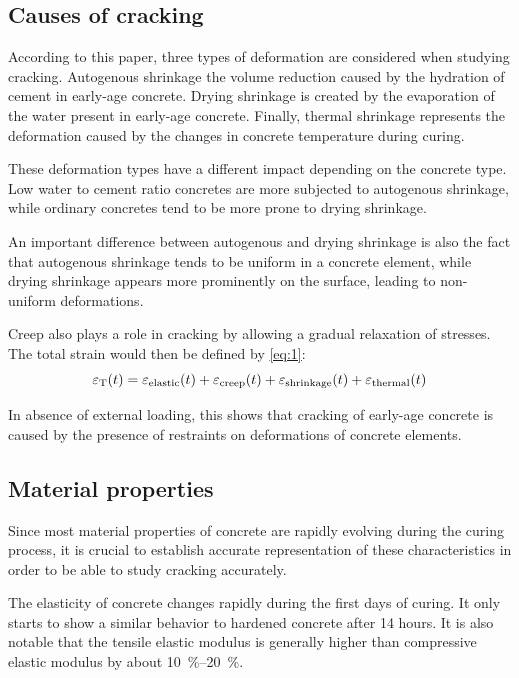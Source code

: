 \documentclass[a4paper,11pt]{memoir}
\begin{document}
\subsection{Causes of cracking}
According to this paper, three types of deformation are considered when
studying cracking. Autogenous shrinkage the volume reduction
caused by the hydration of cement in early-age concrete. Drying shrinkage is
created by the evaporation of the water present in early-age concrete. Finally,
thermal shrinkage represents the deformation caused by the changes in concrete
temperature during curing.

These deformation types have a different impact depending on the concrete type.
Low water to cement ratio concretes are more subjected to autogenous shrinkage, while
ordinary concretes tend to be more prone to drying shrinkage.

An important difference between autogenous and drying shrinkage is also the
fact that autogenous shrinkage tends to be uniform in a concrete element, while
drying shrinkage appears more prominently on the surface, leading to non-uniform
deformations.

Creep also plays a role in cracking by allowing a gradual relaxation of
stresses. The total strain would then be defined by \autoref{eq:1}:
\begin{equation}
  \epsilon_{\text T}(t) =
  \epsilon_{\text{elastic}}(t) +
  \epsilon_{\text{creep}}(t) +
  \epsilon_{\text{shrinkage}}(t) +
  \epsilon_{\text{thermal}}(t)
  \label{eq:1}
\end{equation}

In absence of external loading, this shows that cracking of early-age concrete
is caused by the presence of restraints on deformations of concrete elements.

\subsection{Material properties}
Since most material properties of concrete are rapidly evolving during the
curing process, it is crucial to establish accurate representation of these
characteristics in order to be able to study cracking accurately.

The elasticity of concrete changes rapidly during the first days of curing. It
only starts to show a similar behavior to hardened concrete after 14 hours.
It is also notable that the tensile elastic modulus is generally higher than
compressive elastic modulus by about \SIrange{10}{20}\percent.
\end{document}
